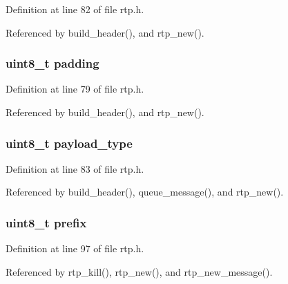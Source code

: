 Definition at line 82 of file rtp.\+h.



Referenced by build\+\_\+header(), and rtp\+\_\+new().

\hypertarget{struct___r_t_p_session_a78a52d3de83ec4d91a7746456627089f}{
\subsubsection[{padding}]{\setlength{\rightskip}{0pt plus 5cm}uint8\+\_\+t padding}}\label{struct___r_t_p_session_a78a52d3de83ec4d91a7746456627089f}


Definition at line 79 of file rtp.\+h.



Referenced by build\+\_\+header(), and rtp\+\_\+new().

\hypertarget{struct___r_t_p_session_a9cdef377149cce5efd90b1e60596573a}{
\subsubsection[{payload\+\_\+type}]{\setlength{\rightskip}{0pt plus 5cm}uint8\+\_\+t payload\+\_\+type}}\label{struct___r_t_p_session_a9cdef377149cce5efd90b1e60596573a}


Definition at line 83 of file rtp.\+h.



Referenced by build\+\_\+header(), queue\+\_\+message(), and rtp\+\_\+new().

\hypertarget{struct___r_t_p_session_acf4a7a7457f3d922d7118075fc1a300b}{
\subsubsection[{prefix}]{\setlength{\rightskip}{0pt plus 5cm}uint8\+\_\+t prefix}}\label{struct___r_t_p_session_acf4a7a7457f3d922d7118075fc1a300b}


Definition at line 97 of file rtp.\+h.



Referenced by rtp\+\_\+kill(), rtp\+\_\+new(), and rtp\+\_\+new\+\_\+message().

